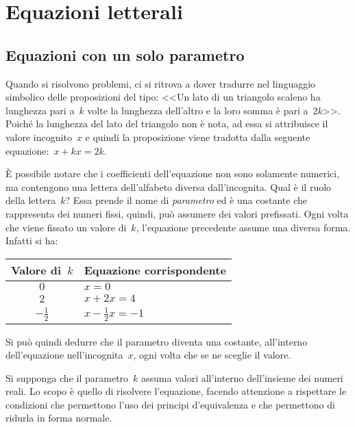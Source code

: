 
\chapter{Equazioni letterali}

\section{Equazioni con un solo parametro}
Quando si risolvono problemi, ci si ritrova a dover tradurre nel linguaggio simbolico delle proposizioni del tipo:
<<Un lato di un triangolo scaleno ha lunghezza pari a~$k$ volte la lunghezza dell'altro e la loro somma è pari a~$2k$>>.
Poiché la lunghezza del lato del triangolo non è nota, ad essa si attribuisce il valore incognito~$x$ e quindi la proposizione
viene tradotta dalla seguente equazione:~$x+kx=2k$.

È possibile notare che i coefficienti dell'equazione non sono solamente numerici, ma contengono una lettera dell'alfabeto diversa
dall'incognita. Qual è il ruolo della lettera~$k$?
Essa prende il nome di \emph{parametro} ed è una costante che rappresenta dei numeri fissi, quindi, può assumere dei valori prefissati.
Ogni volta che viene fissato un valore di~$k$, l'equazione precedente assume una diversa forma. Infatti si ha:
\begin{center}
\begin{tabular}{cl}
\toprule
Valore di~$k$ & Equazione corrispondente\\
\midrule
$0$ & $x=0$\\
$2$ & $x+2x=4$\\
$-\frac{1}{2}$ & $x-\frac{1}{2}x=-1$\\
\bottomrule
\end{tabular}
\end{center}

Si può quindi dedurre che il parametro diventa una costante, all'interno dell'equazione nell'incognita~$x$, ogni volta che se ne sceglie il valore.

Si supponga che il parametro~$k$ assuma valori all'interno dell'insieme dei numeri reali. Lo scopo è quello di risolvere l'equazione,
facendo attenzione a rispettare le condizioni che permettono l'uso dei principi d'equivalenza e che permettono di ridurla in forma normale.

